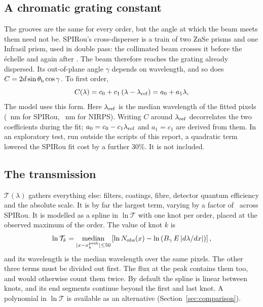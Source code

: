 \documentclass[11pt,a4paper]{article}
\begin{document}
\subsection{A chromatic grating constant}
\label{sec:chromatic}

The grooves are the same for every order, but the angle at which the beam meets them need not be. SPIRou's cross-disperser is a train of two ZnSe prisms and one Infrasil prism, used in double pass: the collimated beam crosses it before the \'echelle and again after \citep{Donati2020,Thibault2012}. The beam therefore reaches the grating already dispersed. Its out-of-plane angle $\gamma$ depends on wavelength, and so does $C = 2d\sin\theta_{\rm b}\cos\gamma$. To first order,
\begin{equation}
C(\lambda) = c_0 + c_1\,(\lambda-\lambda_{\rm ref}) = a_0 + a_1\lambda,
\label{eq:chromatic}
\end{equation}
The model uses this form. Here $\lambda_{\rm ref}$ is the median wavelength of the fitted pixels (\spLref~nm for SPIRou, \niLref~nm for NIRPS). Writing $C$ around $\lambda_{\rm ref}$ decorrelates the two coefficients during the fit; $a_0 = c_0 - c_1\lambda_{\rm ref}$ and $a_1 = c_1$ are derived from them. In an exploratory test, run outside the scripts of this report, a quadratic term lowered the SPIRou fit cost by a further 30\%. It is not included.

\subsection{The transmission}
\label{sec:transmission}

$\mathcal{T}(\lambda)$ gathers everything else: filters, coatings, fibre, detector quantum efficiency and the absolute scale. It is by far the largest term, varying by a factor of \spTransRange\ across SPIRou. It is modelled as a spline in $\ln\mathcal{T}$ with one knot per order, placed at the observed maximum of the order. The value of knot $k$ is
\begin{equation}
\ln\mathcal{T}_k = \operatorname*{median}_{|x-x_k^{\rm peak}|\le 50}\left[\ln N_{\rm obs}(x) - \ln\left(B_\gamma\,E\,|d\lambda/dx|\right)\right],
\end{equation}
and its wavelength is the median wavelength over the same pixels. The other three terms must be divided out first. The flux at the peak contains them too, and would otherwise count them twice. By default the spline is linear between knots, and its end segments continue beyond the first and last knot. A polynomial in $\ln\mathcal{T}$ is available as an alternative (Section~\ref{sec:comparison}).
\end{document}
